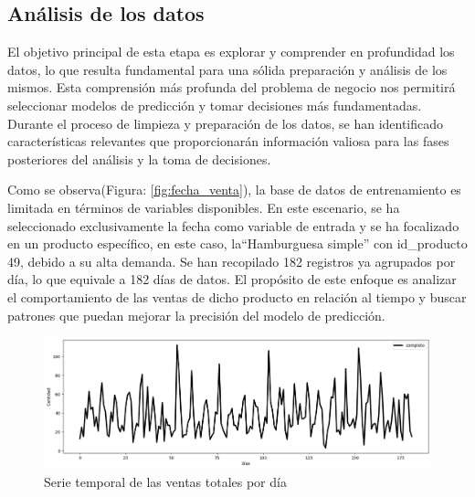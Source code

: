 \subsection{Análisis de los datos }
El objetivo principal de esta etapa es explorar y comprender en profundidad los datos, lo que resulta fundamental para una sólida preparación y análisis de los mismos. Esta comprensión más profunda del problema de negocio nos permitirá seleccionar modelos de predicción y tomar decisiones más fundamentadas. Durante el proceso de limpieza y preparación de los datos, se han identificado características relevantes que proporcionarán información valiosa para las fases posteriores del análisis y la toma de decisiones.

\vspace{1\baselineskip}
Como se observa(Figura: \ref{fig:fecha_venta}), la base de datos de entrenamiento es limitada en términos de variables disponibles. En este escenario, se ha seleccionado exclusivamente la fecha como variable de entrada y se ha focalizado en un producto específico, en este caso, la“Hamburguesa simple” con id\_producto 49, debido a su alta demanda. Se han recopilado 182 registros ya agrupados por día, lo que equivale a 182 días de datos. El propósito de este enfoque es analizar el comportamiento de las ventas de dicho
producto en relación al tiempo y buscar patrones que puedan mejorar la precisión del modelo de predicción.

\begin{figure}[H]
  \begin{center}
    \includegraphics[scale=0.40]{./serie_normal_completa.png}
    \caption{Serie temporal de las ventas totales por día}
    \label{fig:serie_completa}
  \end{center}
\end{figure}

%   


